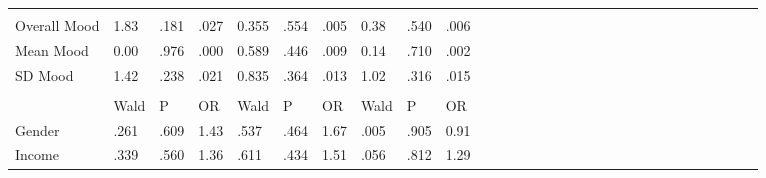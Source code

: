 \documentclass[authordate, empirical,issue]{jote-new-article}
\begin{document}
\begin{table}[t]
\begin{fullwidth}
\begin{tabular}{@{} l l l l l l l l l l l l l l l l l l l l l l l l l l l l l l @{}}
                              &                                                 &                                       &                     &       &      &                     &      &      &                     \\

      Overall Mood            & 1.83                                            & .181                                  & .027                & 0.355 & .554 & .005                & 0.38 & .540 &
      .006                                                                                                                                                                                                             \\

      Mean Mood               & 0.00                                            & .976                                  & .000                & 0.589 & .446 & .009                & 0.14 & .710 & .002
      \\

      SD Mood                 & 1.42                                            & .238                                  & .021                & 0.835 & .364 & .013                & 1.02 & .316 & .015
      \\

                              &                                                 &                                       &                     &       &      &                     &      &      &                     \\

      \hline                  & Wald                                            & P                                     & OR                  & Wald  & P    & OR                  & Wald & P    & OR                  \\

      \hline Gender           & .261                                            & .609                                  & 1.43                & .537  & .464 & 1.67                & .005 & .905 & 0.91
      \\

      Income                  & .339                                            & .560                                  & 1.36                & .611  & .434 & 1.51                & .056 & .812 & 1.29                \\
    \end{tabular}
  \end{fullwidth}
\end{table}
\end{document}
